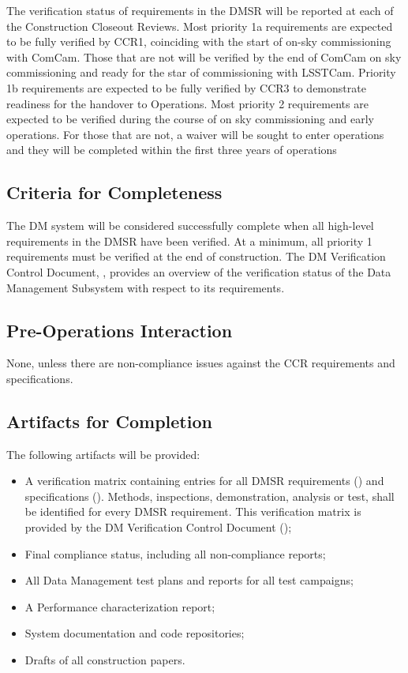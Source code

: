 The verification status of requirements in the DMSR will be reported at each of the Construction Closeout Reviews.
Most priority 1a requirements are expected to be fully verified by CCR1, coinciding with the start of on-sky commissioning with ComCam. Those that are not will be verified by the end of ComCam on sky commissioning and ready for the star of commissioning with LSSTCam.
Priority 1b requirements are expected to be fully verified by CCR3 to demonstrate readiness for the handover to Operations.
Most priority 2 requirements are expected to be verified during the course of on sky commissioning and early operations. For those that are not, a waiver will be sought  to enter operations and they will be completed within the first three years of operations

\subsection{Criteria for Completeness} \label{sec:dm-completeness}
The DM system will be considered successfully complete when all high-level requirements in the DMSR have been verified.
At a minimum, all priority 1 requirements must be verified at the end of construction.
The DM Verification Control Document, ,  provides an overview of the verification status of the Data Management Subsystem with respect to its requirements.

\subsection{Pre-Operations Interaction}
None, unless there are non-compliance issues against the CCR requirements and specifications.

\subsection{Artifacts for Completion} \label{sec:dm-artifacts}
The following artifacts will be provided:
\begin{itemize}
	\item A verification matrix containing entries for all DMSR requirements () and specifications (). Methods, inspections, demonstration, analysis or test, shall be identified for every DMSR requirement. This verification matrix is provided by the DM Verification Control Document ();
	\item Final compliance status, including all non-compliance reports;
	\item All Data Management test plans and reports for all test campaigns;
	\item A Performance characterization report;
	\item System documentation and code repositories;
	\item Drafts of all construction papers.
\end{itemize}


